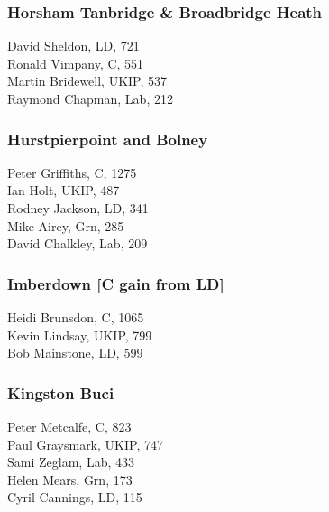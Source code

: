 \documentclass[a4paper,openany,10pt]{book}
\begin{document}
\subsubsection*{Horsham Tanbridge \& Broadbridge Heath}



David Sheldon, LD, 721\\
Ronald Vimpany, C, 551\\
Martin Bridewell, UKIP, 537\\
Raymond Chapman, Lab, 212\\


\subsubsection*{Hurstpierpoint and Bolney}



Peter Griffiths, C, 1275\\
Ian Holt, UKIP, 487\\
Rodney Jackson, LD, 341\\
Mike Airey, Grn, 285\\
David Chalkley, Lab, 209\\


\subsubsection*{Imberdown \hspace*{\fill}\nolinebreak[1]%
\enspace\hspace*{\fill}
[C gain from LD]}



Heidi Brunsdon, C, 1065\\
Kevin Lindsay, UKIP, 799\\
Bob Mainstone, LD, 599\\


\subsubsection*{Kingston Buci}



Peter Metcalfe, C, 823\\
Paul Graysmark, UKIP, 747\\
Sami Zeglam, Lab, 433\\
Helen Mears, Grn, 173\\
Cyril Cannings, LD, 115\\
\end{document}
